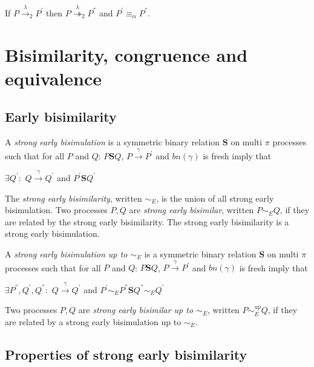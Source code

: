 \begin{lemma}\label{pushAlfaEquivalence}
  If $P\xrightarrow{\lambda}_{2} P^{'}$ then $P\stackrel{\lambda}{\twoheadrightarrow}_{2} P^{''}$ and $P^{'}\equiv_{\alpha} P^{''}$.
\end{lemma}


\section{Bisimilarity, congruence and equivalence}

\subsection{Early bisimilarity}

\begin{definition}\label{strongEarlyBisimulation}
  A \emph{strong early bisimulation} is a symmetric binary relation $\mathbf{S}$ on multi $\pi$ processes such that for all $P$ and $Q$: $P \mathbf{S} Q$, $P \xrightarrow{\gamma} P^{'}$ and $bn(\gamma)$ is fresh imply that
  \begin{center}
    $\exists Q^{'}:$ $Q \xrightarrow{\gamma} Q^{'}$ and $P^{'}\mathbf{S} Q^{'}$
  \end{center}
  The \emph{strong early bisimilarity}, written $\sim_{E}$, is the union of all strong early bisimulation. Two processes $P,Q$ are \emph{strong early bisimilar}, written $P \sim_{E} Q$, if they are related by the strong early bisimilarity. The strong early bisimilarity is a strong early bisimulation.
\end{definition}

\begin{definition}\label{strongEarlyBisimulationUpTo}
  A \emph{strong early bisimulation up to $\sim_{E}$} is a symmetric binary relation $\mathbf{S}$ on multi $\pi$ processes such that for all $P$ and $Q$: $P \mathbf{S} Q$, $P \xrightarrow{\gamma} P^{'}$ and $bn(\gamma)$ is fresh imply that
  \begin{center}
    $\exists P^{''},Q^{'},Q^{''}:$ $Q \xrightarrow{\gamma} Q^{'}$ and $P^{'} \sim_{E} P^{''} \mathbf{S} Q^{''} \sim_{E} Q^{'} $
  \end{center}
  Two processes $P,Q$ are \emph{strong early bisimilar up to $\sim_{E}$}, written $P \sim_{E}^{up} Q$, if they are related by a strong early bisimulation up to $\sim_{E}$.
\end{definition}

\subsection{Properties of strong early bisimilarity}

